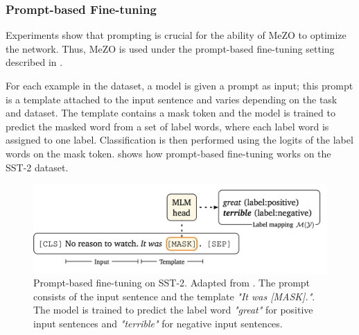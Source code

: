 \subsubsection{Prompt-based Fine-tuning}

Experiments show that prompting is crucial for the ability of MeZO to optimize the network. Thus, MeZO is used under the prompt-based fine-tuning setting described in \cite{prompt}. 

For each example in the dataset, a model is given a prompt as input; this prompt is a template attached to the input sentence and varies depending on the task and dataset. The template contains a mask token and the model is trained to predict the masked word from a set of label words, where each label word is assigned to one label. Classification is then performed using the logits of the label words on the mask token.  shows how prompt-based fine-tuning works on the SST-2 dataset. 

\begin{figure}
    \centering
    \includegraphics[width=\linewidth]{assets/images/Prompt.png}
    \caption{Prompt-based fine-tuning on SST-2. Adapted from \cite{prompt}. The prompt consists of the input sentence and the template \textit{"It was [MASK]."}. The model is trained to predict the label word \textit{"great"} for positive input sentences and \textit{"terrible"} for negative input sentences.}
    \label{fig:prompt}
\end{figure}